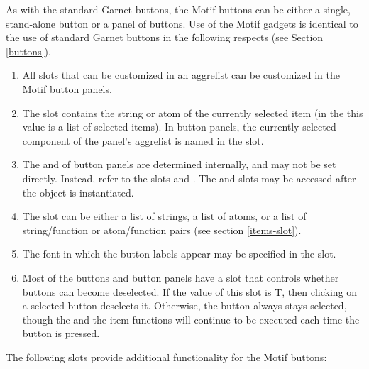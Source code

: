 As with the standard Garnet buttons, the Motif buttons can be either a single,
stand-alone button or a panel of buttons.  Use of the Motif gadgets is
identical to the use of standard Garnet buttons in the following respects
(see Section \ref{buttons}).

\begin{enumerate}
\item All slots that can be customized in an aggrelist can be customized in the
Motif button panels.

\item The  slot contains the string or atom of the currently selected
item (in the  this value is a list of selected
items).  In button panels, the currently selected component of the panel's
aggrelist is named in the  slot.

\item The  and  of button panels are determined internally,
and may not be set directly.  Instead, refer to the slots
 and .  The  and
 slots may be accessed after the object is instantiated.

\item The  slot can be either a list of strings, a list of atoms, or a
list of string/function or atom/function pairs (see section \ref{items-slot}).

\item The font in which the button labels appear may be specified in the 
slot.

\item Most of the buttons and button panels have a  slot that
controls whether buttons can become deselected.  If the value of this
slot is T, then clicking on a selected button deselects it.  Otherwise,
the button always stays selected, though the 
and the item functions will continue to be executed each time the
button is pressed.
\end{enumerate}

The following slots provide additional functionality for the Motif buttons:

